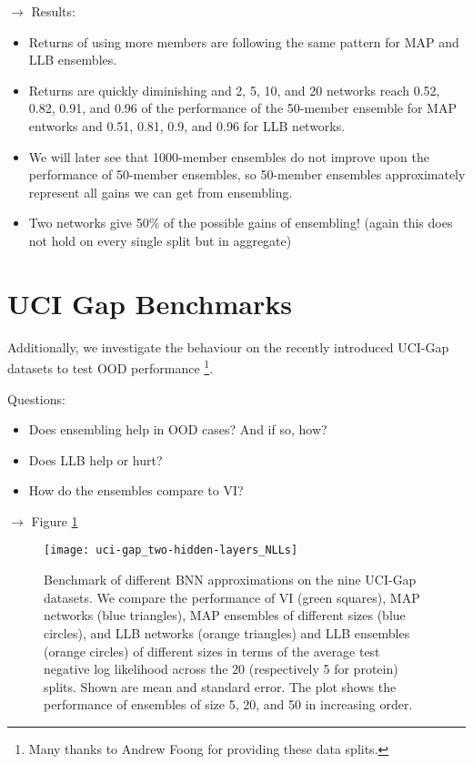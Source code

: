 \documentclass[../thesis.tex]{subfiles}
\begin{document}
\bigskip

$\rightarrow$ Results:
\begin{itemize}
    \item Returns of using more members are following the same pattern for MAP and LLB ensembles.
    \item Returns are quickly diminishing and 2, 5, 10, and 20 networks reach 0.52, 0.82, 0.91, and 0.96 of the performance of the 50-member ensemble for MAP entworks and 0.51, 0.81, 0.9, and 0.96 for LLB networks. 
    \item We will later see that 1000-member ensembles do not improve upon the performance of 50-member ensembles, so 50-member ensembles approximately represent all gains we can get from ensembling.
    \item Two networks give 50\% of the possible gains of ensembling! (again this does not hold on every single split but in aggregate)
\end{itemize}


\section{UCI Gap Benchmarks}
Additionally, we investigate the behaviour on the recently introduced UCI-Gap datasets to test OOD performance \parencite{foong2019between}\footnote{Many thanks to Andrew Foong for providing these data splits.}. 
\bigskip

Questions:
\begin{itemize}
    \item Does ensembling help in OOD cases? And if so, how?
    \item Does LLB help or hurt?
    \item How do the ensembles compare to VI?
\end{itemize}
\bigskip

$\rightarrow$ Figure \ref{fig:uci-gap-benchmark}

\begin{figure}
    \centering
    \texttt{[image: uci-gap\_two-hidden-layers\_NLLs]} 
    \caption{Benchmark of different BNN approximations on the nine UCI-Gap datasets. We compare the performance of VI (green squares), MAP networks (blue triangles), MAP ensembles of different sizes (blue circles), and LLB networks (orange triangles) and LLB ensembles (orange circles) of different sizes in terms of the average test negative log likelihood across the 20 (respectively 5 for protein) splits. Shown are mean and standard error. The plot shows the performance of ensembles of size 5, 20, and 50 in increasing order.}
    \label{fig:uci-gap-benchmark}
\end{figure}
\end{document}
